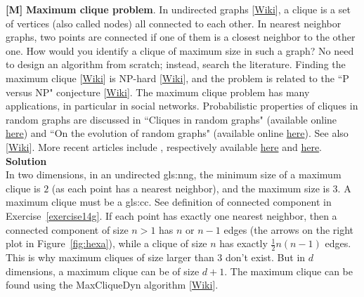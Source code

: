 \documentclass[10pt]{article}
\begin{document}
\begin{Exercise}\label{cliquebc}{\bf [M]} {\bf Maximum clique problem}. In \textcolor{index}{undirected graphs} [\href{https://en.wikipedia.org/?title=Undirected_graph}{Wiki}], a
\textcolor{index}{clique} is a set of vertices (also called nodes) all connected to each other.  In
\textcolor{index}{nearest neighbor} graphs, two points are connected if one of them is a closest neighbor to the other one.  How would you identify a clique of maximum size in such a graph? No need to design an algorithm from scratch; instead, search the literature. Finding the maximum clique
[\href{https://en.wikipedia.org/wiki/Clique_problem}{Wiki}] is NP-hard [\href{https://en.wikipedia.org/wiki/NP-hardness}{Wiki}], and the problem is related to the
``P versus NP" conjecture [\href{https://en.wikipedia.org/wiki/P_versus_NP_problem}{Wiki}].  The maximum clique problem has many applications,
in particular in social networks.  Probabilistic properties of cliques in \textcolor{index}{random graphs} are discussed in
``Cliques in random graphs" \cite{erdos311} (available online \href{https://users.renyi.hu/~p_erdos/1976-05.pdf}{here}) and
``On the evolution of random graphs" \cite{erdos310} (available online \href{http://snap.stanford.edu/class/cs224w-readings/erdos60random.pdf}{here}).
See also [\href{https://bit.ly/3uzQzNF}{Wiki}]. More recent articles include \cite{mec45,nmbv}, respectively available
 \href{https://arxiv.org/abs/1308.3297}{here} and \href{https://arxiv.org/abs/1508.01668}{here}. \vspace{1ex} \\
{\bf Solution}\nopagebreak \vspace{1ex}\\
In two dimensions, in an \textcolor{index}{undirected} \gls{gls:nng},
the minimum size of a maximum clique is $2$ (as each point has a nearest neighbor), and the maximum size is $3$. A maximum clique must be a
\gls{gls:cc}. See definition of connected component in Exercise~\ref{exercise14g}. If each point has exactly one nearest neighbor, then a connected component of size $n>1$ has $n$ or $n-1$ edges
(the arrows on the right plot in Figure~\ref{fig:hexa}), while a clique of size $n$ has exactly $\frac{1}{2}n(n-1)$ edges. This is why maximum cliques of size larger than $3$ don't exist. But in $d$ dimensions, a maximum clique can be of size $d+1$. The maximum clique can be found using the MaxCliqueDyn
algorithm [\href{https://en.wikipedia.org/wiki/MaxCliqueDyn_maximum_clique_algorithm}{Wiki}].
\end{Exercise}
\end{document}
